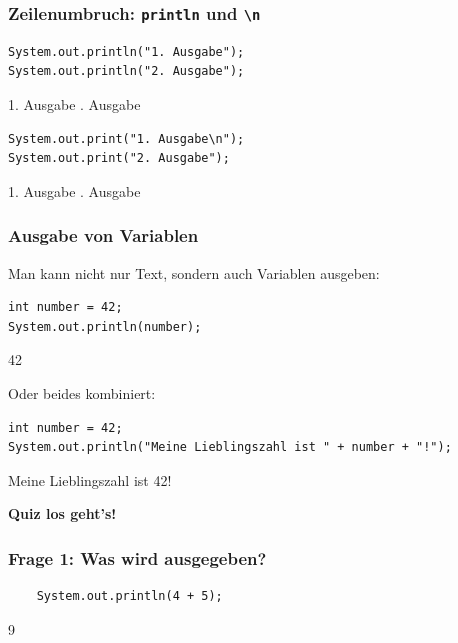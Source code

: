 \documentclass{../../presentation}
\begin{document}
\begin{frame}[fragile]
	\frametitle{Zeilenumbruch: \texttt{println} und \texttt{\textbackslash n}}
	\pause
	\begin{verbatim}
System.out.println("1. Ausgabe");
System.out.println("2. Ausgabe");
  \end{verbatim}
	\pause
	\begin{ausgabe}
		1. Ausgabe . Ausgabe
	\end{ausgabe}
	\pause
	\begin{verbatim}
System.out.print("1. Ausgabe\n");
System.out.print("2. Ausgabe");
  \end{verbatim}
	\pause
	\begin{ausgabe}
		1. Ausgabe . Ausgabe
	\end{ausgabe}
\end{frame}

\begin{frame}[fragile]
	\frametitle{Ausgabe von Variablen}
	\pause
	Man kann nicht nur Text, sondern auch Variablen ausgeben:
	\pause
	\begin{verbatim}
int number = 42;
System.out.println(number);
  \end{verbatim}
	\begin{ausgabe}
		42
	\end{ausgabe}
	\pause
	Oder beides kombiniert:
	\begin{verbatim}
int number = 42;
System.out.println("Meine Lieblingszahl ist " + number + "!");
  \end{verbatim}
	\pause
	\begin{ausgabe}
		Meine Lieblingszahl ist 42!
	\end{ausgabe}
\end{frame}

\begin{frame}[plain]
	\centering
	{\Huge\bfseries{Quiz los geht's!}}
\end{frame}

\begin{frame}[fragile]
	\frametitle{Frage 1: Was wird ausgegeben?}
	\begin{verbatim}
    System.out.println(4 + 5);
  \end{verbatim}
	\pause
	\begin{ausgabe}
		9
	\end{ausgabe}
\end{frame}
\end{document}
